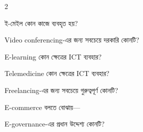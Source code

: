 \begin{topicbody}
\begin{multicols}{2}
\begin{compactenum}
\item \begin{minipage}[t]{\linewidth}ই-মেইল কোন কাজে ব্যবহৃত হয়?\par {}\par\end{minipage}

\item \begin{minipage}[t]{\linewidth}Video conferencing-এর জন্য সবচেয়ে দরকারি কোনটি?\par {}\par\end{minipage}

\item \begin{minipage}[t]{\linewidth}E-learning কোন ক্ষেত্রের ICT ব্যবহার?\par {}\par\end{minipage}

\item \begin{minipage}[t]{\linewidth}Telemedicine কোন ক্ষেত্রের ICT ব্যবহার?\par {}\par\end{minipage}

\item \begin{minipage}[t]{\linewidth}Freelancing-এর জন্য সবচেয়ে গুরুত্বপূর্ণ কোনটি?\par {}\par\end{minipage}

\item \begin{minipage}[t]{\linewidth}E-commerce বলতে বোঝায়—\par {}\par\end{minipage}

\item \begin{minipage}[t]{\linewidth}E-governance-এর প্রধান উদ্দেশ্য কোনটি?\par {}\par\end{minipage}


\end{compactenum}
\end{multicols}
\end{topicbody}
